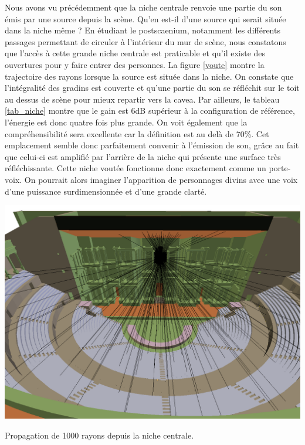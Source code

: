 Nous avons vu précédemment que la niche centrale renvoie une partie du son émis par une source depuis la scène. Qu'en est-il d'une source qui serait située dans la niche même ? En étudiant le \gls{postscaenium}, notamment les différents passages permettant de circuler à l'intérieur du mur de scène, nous constatons que l'accès à cette grande niche centrale est praticable et qu'il existe des ouvertures pour y faire entrer des personnes. La figure \ref{voute} montre la trajectoire des rayons lorsque la source est située dans la niche. On constate que l'intégralité des gradins est couverte et qu'une partie du son se réfléchit sur le toit au dessus de scène pour mieux repartir vers la \gls{cavea}. Par ailleurs, le tableau \ref{tab_niche} montre que le gain est 6dB supérieur à la configuration de référence, l'énergie est donc quatre fois plus grande. On voit également que la compréhensibilité sera excellente car la définition est au delà de 70\%. Cet emplacement semble donc parfaitement convenir à l'émission de son, grâce au fait que celui-ci est amplifié par l'arrière de la niche qui présente une surface très réfléchissante. Cette niche voutée fonctionne donc exactement comme un porte-voix. On pourrait alors imaginer l'apparition de personnages divins \cite[p.12]{vitruve} avec une voix d'une puissance surdimensionnée et d'une grande clarté.
\begin{figureth}
	\includegraphics[width=0.8\linewidth]{images/voute}
	\caption{Propagation de 1000 rayons depuis la niche centrale.}
	\label{voute}
\end{figureth}

